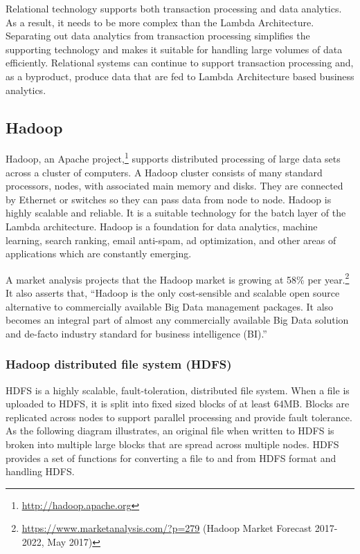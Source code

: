 \documentclass[
]{article}
\begin{document}
Relational technology supports both transaction processing and data
analytics. As a result, it needs to be more complex than the Lambda
Architecture. Separating out data analytics from transaction processing
simplifies the supporting technology and makes it suitable for handling
large volumes of data efficiently. Relational systems can continue to
support transaction processing and, as a byproduct, produce data that
are fed to Lambda Architecture based business analytics.

\hypertarget{hadoop}{%
\subsection*{Hadoop}\label{hadoop}}

Hadoop, an Apache project,\footnote{\href{http://hadoop.apache.org}{\underline{http://hadoop.apache.org}}} supports distributed
processing of large data sets across a cluster of computers. A Hadoop
cluster consists of many standard processors, nodes, with associated
main memory and disks. They are connected by Ethernet or switches so
they can pass data from node to node. Hadoop is highly scalable and
reliable. It is a suitable technology for the batch layer of the Lambda
architecture. Hadoop is a foundation for data analytics, machine
learning, search ranking, email anti-spam, ad optimization, and other
areas of applications which are constantly emerging.

A market analysis projects that the Hadoop market is growing at 58\% per
year.\footnote{\href{https://www.marketanalysis.com/?p=279}{\underline{https://www.marketanalysis.com/?p=279}}
  (Hadoop Market Forecast 2017-2022, May 2017)} It also asserts that, ``Hadoop is the only
cost-sensible and scalable open source alternative to commercially
available Big Data management packages. It also becomes an integral part
of almost any commercially available Big Data solution and de-facto
industry standard for business intelligence (BI).''

\hypertarget{hadoop-distributed-file-system-hdfs}{%
\subsubsection*{Hadoop distributed file system (HDFS)}\label{hadoop-distributed-file-system-hdfs}}

HDFS is a highly scalable, fault-toleration, distributed file system.
When a file is uploaded to HDFS, it is split into fixed sized blocks of
at least 64MB. Blocks are replicated across nodes to support parallel
processing and provide fault tolerance. As the following diagram
illustrates, an original file when written to HDFS is broken into
multiple large blocks that are spread across multiple nodes. HDFS
provides a set of functions for converting a file to and from HDFS
format and handling HDFS.
\end{document}
